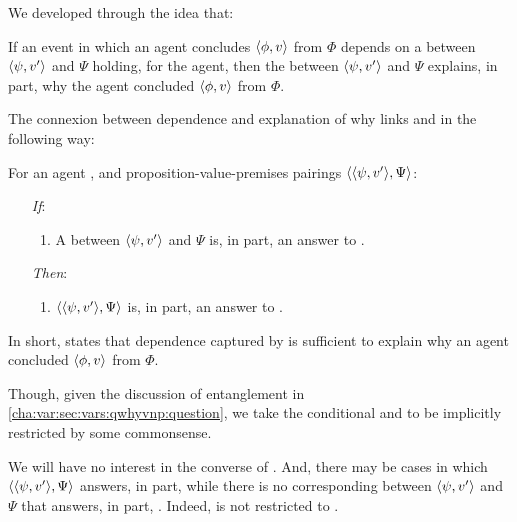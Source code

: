 \begin{note}
  We developed \qWhyV{} through the idea that:

  If an event in which an agent concludes \(\langle \phi, v \rangle\) from \(\Phi\) depends on a  between \(\langle \psi, v' \rangle\) and \(\Psi\) holding, for the agent, then the  between \(\langle \psi, v' \rangle\) and \(\Psi\) explains, in part, why the agent concluded \(\langle \phi, v \rangle\) from \(\Phi\).

  The connexion between dependence and explanation of why links \qWhyV{} and \qWhy{} in the following way:

  \begin{link}
    \label{link:why:support:pvpp}
    For an agent \vAgent{}, and proposition-value-premises pairings \(\langle \langle \psi, v' \rangle, \Psi \rangle\):

    \begin{itemize}
    \item[\emph{If}:]
      \begin{enumerate}[label=\alph*., ref=(\alph*)]
      \item
        A  between \(\langle \psi, v' \rangle\) and \(\Psi\) is, in part, an answer to \qWhyV{}.
      \end{enumerate}
    \item[\emph{Then}:]
      \begin{enumerate}[label=\alph*., ref=(\alph*), resume]
      \item
        \(\langle \langle \psi, v' \rangle, \Psi \rangle\) is, in part, an answer to \qWhy{}.
      \end{enumerate}
    \end{itemize}
    \vspace{-\baselineskip}
  \end{link}

  In short, \linkW{} states that dependence captured by \qWhyV{} is sufficient to explain why an agent concluded \(\langle \phi, v \rangle\) from \(\Phi\).
\end{note}

\begin{note}
  Though, given the discussion of entanglement in \autoref{cha:var:sec:vars:qwhyvnp:question}, we take the conditional and to be implicitly restricted by some commonsense.

  We will have no interest in the converse of \linkW{}.
  And, there may be cases in which \(\langle \langle \psi, v' \rangle, \Psi \rangle\) answers, in part, \qWhy{} while there is no corresponding \ros{} between \(\langle \psi, v' \rangle\) and \(\Psi\) that answers, in part, \qWhyV{}.
  Indeed, \qWhy{} is not restricted to .
\end{note}

